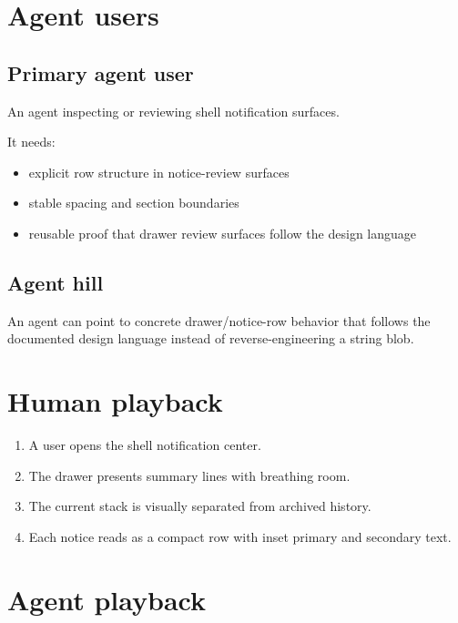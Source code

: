 \section{Agent users}\label{record-171-agent-users}

\subsection{Primary agent user}\label{record-171-primary-agent-user}

An agent inspecting or reviewing shell notification surfaces.

It needs:

\begin{itemize}
\tightlist
\item
  explicit row structure in notice-review surfaces
\item
  stable spacing and section boundaries
\item
  reusable proof that drawer review surfaces follow the design language
\end{itemize}

\subsection{Agent hill}\label{record-171-agent-hill}

An agent can point to concrete drawer/notice-row behavior that follows the documented design language instead of reverse-engineering a string blob.

\section{Human playback}\label{record-171-human-playback}

\begin{enumerate}
\def\labelenumi{\arabic{enumi}.}
\tightlist
\item
  A user opens the shell notification center.
\item
  The drawer presents summary lines with breathing room.
\item
  The current stack is visually separated from archived history.
\item
  Each notice reads as a compact row with inset primary and secondary text.
\end{enumerate}

\section{Agent playback}\label{record-171-agent-playback}

